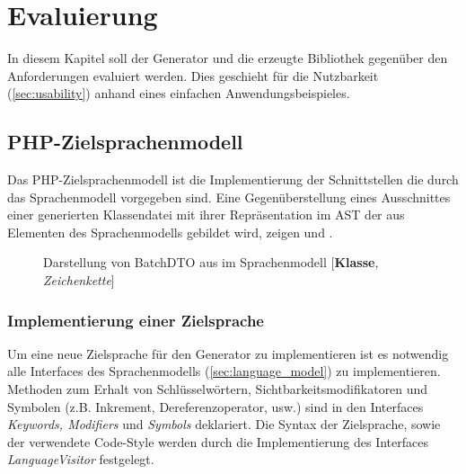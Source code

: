 \chapter{Evaluierung}
\label{chap:evaluation}


In diesem Kapitel soll der Generator und die erzeugte Bibliothek gegenüber den Anforderungen evaluiert werden. Dies geschieht für die Nutzbarkeit (\cref{sec:usability}) anhand eines einfachen Anwendungsbeispieles.

\section{PHP-Zielsprachenmodell}
\label{sec:php_target_language_model}

Das PHP-Zielsprachenmodell ist die Implementierung der Schnittstellen die durch das Sprachenmodell vorgegeben sind.
Eine Gegenüberstellung eines Ausschnittes einer generierten Klassendatei mit ihrer Repräsentation im \gls{AST} der aus Elementen des Sprachenmodells gebildet wird, zeigen  und .

\begin{sidewaysfigure}
    \centering
    \resizebox{\textwidth}{!}{
      
    }
    \caption{Darstellung von BatchDTO aus  im Sprachenmodell [\textbf{Klasse}, \emph{Zeichenkette}]}
    \label{fig:modelRepresentationOfBatchDTO}
\end{sidewaysfigure}

\subsection{Implementierung einer Zielsprache}
\label{sec:target_language_implementation}

Um eine neue Zielsprache für den Generator zu implementieren ist es notwendig alle Interfaces des Sprachenmodells (\cref{sec:language_model}) zu implementieren. Methoden zum Erhalt von Schlüsselwörtern, Sichtbarkeitsmodifikatoren und Symbolen (z.B. Inkrement, Dereferenzoperator, usw.) sind in den Interfaces \emph{Keywords, Modifiers} und \emph{Symbols} deklariert. Die Syntax der Zielsprache, sowie der verwendete Code-Style werden durch die Implementierung des Interfaces \emph{LanguageVisitor} festgelegt.

